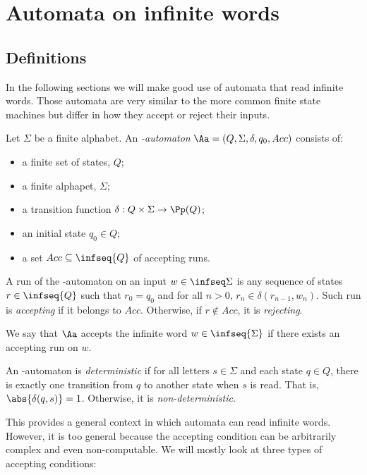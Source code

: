 \tableofcontents


\section{Automata on infinite words}
\subsection{Definitions}

In the following sections
we will make good use of automata that read infinite words.
Those automata are very similar to the more common
finite state machines but differ in how they accept
or reject their inputs.

\begin{definition}
    Let $\Sigma$ be a finite alphabet.
    An \emph{\w-automaton} $\Aa = (Q, \Sigma, \delta, q_0, Acc)$
    consists of:
    \begin{itemize}
        \item a finite set of states, $Q$;
        \item a finite alphapet, $\Sigma$;
        \item a transition function $\delta : Q \times \Sigma \to \Pp(Q)$;
        \item an initial state $q_0 \in Q$;
        \item a set $Acc \subseteq \infseq{Q}$ of accepting runs.
    \end{itemize}

    A run of the \w-automaton on an input $w \in \infseq\Sigma$
    is any sequence of states $r \in \infseq{Q}$ such that
    $r_0 = q_0$ and for all $n > 0$, $r_n \in \delta(r_{n-1}, w_n)$.
    Such run is \emph{accepting} if it belongs to $Acc$.
    Otherwise, if $r \notin Acc$, it is \emph{rejecting}.

    We say that $\Aa$ accepts the infinite word $w \in \infseq{\Sigma}$
    if there exists an accepting run on $w$.

    An \w-automaton is \emph{deterministic} if for all
    letters $s \in \Sigma$ and each state $q \in Q$,
    there is exactly one transition from $q$ to another state
    when $s$ is read. That is, $\abs{\delta(q, s)} = 1$.
    Otherwise, it is \emph{non-deterministic}.

\end{definition}

This provides a general context in which automata can read infinite
words. However, it is too general because the accepting condition
can be arbitrarily complex and even non-computable.
We will mostly look at three types of accepting conditions:

